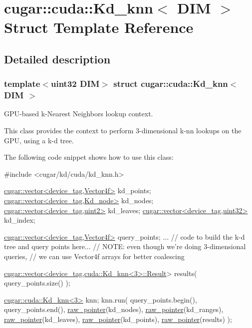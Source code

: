 \hypertarget{structcugar_1_1cuda_1_1_kd__knn}{}\section{cugar\+:\+:cuda\+:\+:Kd\+\_\+knn$<$ D\+IM $>$ Struct Template Reference}
\label{structcugar_1_1cuda_1_1_kd__knn}


\subsection{Detailed description}
\subsubsection*{template$<$uint32 D\+IM$>$\newline
struct cugar\+::cuda\+::\+Kd\+\_\+knn$<$ D\+I\+M $>$}

G\+P\+U-\/based k-\/\+Nearest Neighbors lookup context.

This class provides the context to perform 3-\/dimensional k-\/nn lookups on the G\+PU, using a k-\/d tree.

The following code snippet shows how to use this class\+:


\begin{DoxyCode}
\textcolor{preprocessor}{#include <cugar/kd/cuda/kd\_knn.h>}

\hyperlink{structcugar_1_1vector}{cugar::vector<device\_tag,Vector4f>} kd\_points;
\hyperlink{structcugar_1_1vector}{cugar::vector<device\_tag,Kd\_node>}  kd\_nodes;
\hyperlink{structcugar_1_1vector}{cugar::vector<device\_tag,uint2>}    kd\_leaves;
\hyperlink{structcugar_1_1vector}{cugar::vector<device\_tag,uint32>}   kd\_index;

\hyperlink{structcugar_1_1vector}{cugar::vector<device\_tag,Vector4f>} query\_points;
... \textcolor{comment}{// code to build the k-d tree and query points here...}
    \textcolor{comment}{// NOTE: even though we're doing 3-dimensional queries,}
    \textcolor{comment}{// we can use Vector4f arrays for better coalescing}

\hyperlink{structcugar_1_1vector}{cugar::vector<device\_tag,cuda::Kd\_knn<3>::Result}> results( 
      query\_points.size() );

\hyperlink{structcugar_1_1cuda_1_1_kd__knn}{cugar::cuda::Kd\_knn<3>} knn;
knn.run(
    query\_points.begin(),
    query\_points.end(),
    \hyperlink{namespacecugar_a3f6cb2c817f2ba065931cec569aa848b}{raw\_pointer}(kd\_nodes),
    \hyperlink{namespacecugar_a3f6cb2c817f2ba065931cec569aa848b}{raw\_pointer}(kd\_ranges),
    \hyperlink{namespacecugar_a3f6cb2c817f2ba065931cec569aa848b}{raw\_pointer}(kd\_leaves),
    \hyperlink{namespacecugar_a3f6cb2c817f2ba065931cec569aa848b}{raw\_pointer}(kd\_points),
    \hyperlink{namespacecugar_a3f6cb2c817f2ba065931cec569aa848b}{raw\_pointer}(results) );
\end{DoxyCode}
 

